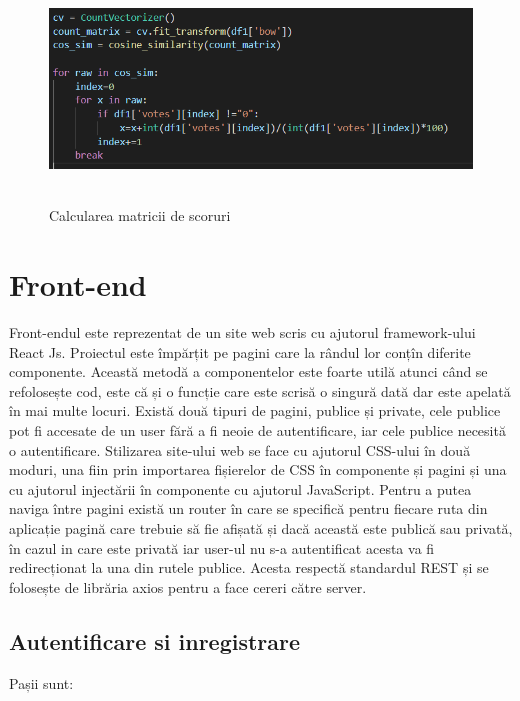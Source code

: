 \begin{figure}[!h]
			\centerline{\includegraphics[width=15cm, height=6cm]{figures/calculare scoruri.png}}
			\caption{Calcularea matricii de scoruri}
			\label{fig}
		\end{figure}

\section{Front-end}
\label{sec:ch5sec1}

\par Front-endul este reprezentat de un site web scris cu ajutorul framework-ului React Js. Proiectul este împărțit pe pagini care la rândul lor conțîn diferite componente. Această metodă a componentelor este foarte utilă atunci când se refolosește cod, este că și o funcție care este scrisă o singură dată dar este apelată în mai multe locuri. Există două tipuri de pagini, publice și private, cele publice pot fi accesate de un user fără a fi neoie de autentificare, iar cele publice necesită o autentificare. Stilizarea site-ului web se face cu ajutorul CSS-ului în două moduri, una fiin prin importarea fișierelor de CSS în componente și pagini și una cu ajutorul injectării în componente cu ajutorul JavaScript. Pentru a putea naviga între pagini există un router în care se specifică pentru fiecare ruta din aplicație pagină care trebuie să fie afișată și dacă această este publică sau privată, în cazul in care este privată iar user-ul nu s-a autentificat acesta va fi redirecționat la una din rutele publice. Acesta respectă standardul REST și se folosește de librăria axios pentru a face cereri către server.
\subsection{Autentificare si inregistrare}
\par Pașii sunt:

